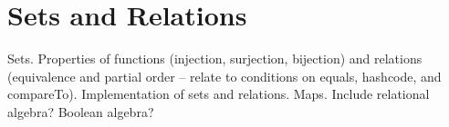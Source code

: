
\section{Sets and Relations}
Sets. Properties of functions (injection, surjection, bijection) and relations (equivalence and partial order -- relate to conditions on equals, hashcode, and compareTo). Implementation of sets and relations. Maps.
Include relational algebra? Boolean algebra?
